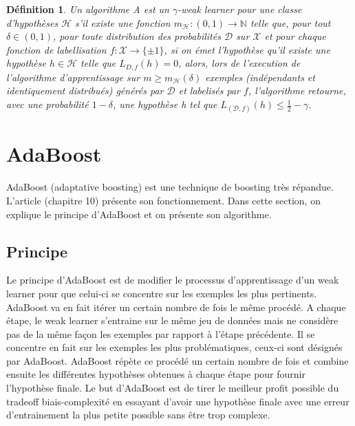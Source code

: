 \documentclass[12pt]{article}
\newtheorem{definition}{Définition}
\begin{document}
	\begin{definition} Un algorithme \textit{A} est un $\gamma$-weak learner pour une classe d'hypothèses $\mathcal{H}$ s'il existe une fonction $m_{\mathcal{H}}: (0,1) \rightarrow \mathbb{N}$ telle que, pour tout $\delta \in (0,1)$, pour toute distribution des probabilités $\mathcal{D}$ sur $\mathcal{X}$ et pour chaque fonction de labellisation $f:\mathcal{X} \rightarrow \{\pm 1\}$, si on émet l'hypothèse qu'il existe une hypothèse $h \in \mathcal H$ telle que $L_{D,f}(h)=0$, alors, lors de l'execution de l'algorithme d'apprentissage sur $m \geq m_{\mathcal{H}}(\delta)$ exemples (indépendants et identiquement distribués) générés par $\mathcal{D}$ et labelisés par $f$, l'algorithme retourne, avec une probabilité $1- \delta$, une hypothèse \textit{h} tel que $L_{(\mathcal{D}, f)}(h) \leq \frac{1}{2} - \gamma$.
		\label{def:weaklearner}
	\end{definition}
	
	\renewcommand{\labelitemi}{$\bullet$}
	\section{AdaBoost}
	
	AdaBoost (adaptative boosting) est une technique de boosting très répandue. L'article \cite{Bousquet2003-oz} (chapitre 10) présente son fonctionnement. Dans cette section, on explique le principe d'AdaBoost et on présente son algorithme.  
	
	\subsection{Principe}
	
	Le principe d'AdaBoost est de modifier le processus d'apprentissage d'un weak learner pour que celui-ci se concentre sur les exemples les plus pertinents. AdaBoost va en fait itérer un certain nombre de fois le même procédé. A chaque étape, le weak learner s'entraine sur le même jeu de données mais ne considère pas de la même façon les exemples par rapport à l'étape précédente. Il se concentre en fait sur les exemples les plus problématiques, ceux-ci sont désignés par AdaBoost. AdaBoost répète ce procédé un certain nombre de fois et combine ensuite les différentes hypothèses obtenues à chaque étape pour fournir l'hypothèse finale. Le but d'AdaBoost est de tirer le meilleur profit possible du tradeoff biais-complexité en essayant d'avoir une hypothèse finale avec une erreur d'entrainement la plus petite possible sans être trop complexe.
	
\end{document}
